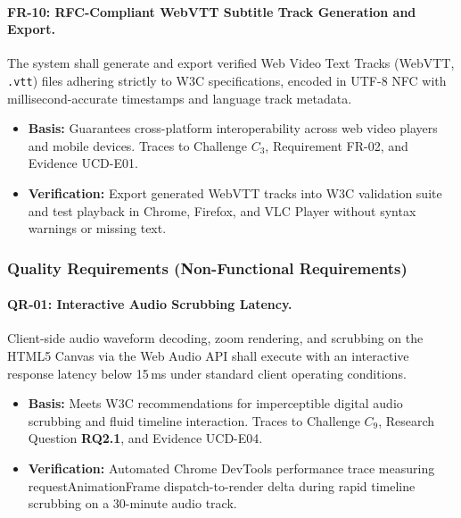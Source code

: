 \documentclass[a4paper,11pt]{article}
\begin{document}
\paragraph{FR-10: RFC-Compliant WebVTT Subtitle Track Generation and Export.}
The system shall generate and export verified Web Video Text Tracks (WebVTT, \texttt{.vtt}) files adhering strictly to W3C specifications, encoded in UTF-8 NFC with millisecond-accurate timestamps and language track metadata.
\begin{itemize}
    \item \textbf{Basis:} Guarantees cross-platform interoperability across web video players and mobile devices. Traces to Challenge $C_3$, Requirement FR-02, and Evidence UCD-E01.
    \item \textbf{Verification:} Export generated WebVTT tracks into W3C validation suite and test playback in Chrome, Firefox, and VLC Player without syntax warnings or missing text.
\end{itemize}

\subsubsection{Quality Requirements (Non-Functional Requirements)}
\label{sec:chap3_req_qr}

\paragraph{QR-01: Interactive Audio Scrubbing Latency.}
Client-side audio waveform decoding, zoom rendering, and scrubbing on the HTML5 Canvas via the Web Audio API shall execute with an interactive response latency below 15\,ms under standard client operating conditions.
\begin{itemize}
    \item \textbf{Basis:} Meets W3C recommendations for imperceptible digital audio scrubbing and fluid timeline interaction. Traces to Challenge $C_9$, Research Question \textbf{RQ2.1}, and Evidence UCD-E04.
    \item \textbf{Verification:} Automated Chrome DevTools performance trace measuring requestAnimationFrame dispatch-to-render delta during rapid timeline scrubbing on a 30-minute audio track.
\end{itemize}
\end{document}
